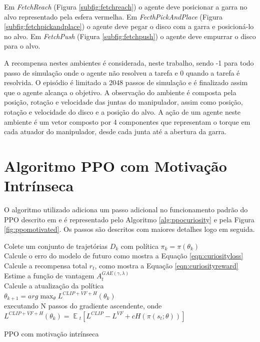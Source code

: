Em \textit{FetchReach} (Figura \ref{subfig:fetchreach}) o agente deve posicionar a garra no alvo representado pela esfera vermelha. Em \textit{FecthPickAndPlace} (Figura \ref{subfig:fetchpickandplace}) o agente deve pegar o disco com a garra e posicioná-lo no alvo. Em \textit{FetchPush} (Figura \ref{subfig:fetchpush}) o agente deve empurrar o disco para o alvo.

A recompensa nestes ambientes é considerada, neste trabalho, sendo -1 para todo passo de simulação onde o agente não resolveu a tarefa e 0 quando a tarefa é resolvida. O episódio é limitado a 2048 passos de simulação e é finalizado assim que o agente alcança o objetivo. A observação do ambiente é composta pela posição, rotação e velocidade das juntas do manipulador, assim como posição, rotação e velocidade do disco e a posição do alvo. A ação de um agente neste ambiente é um vetor composto por 4 componentes que representam o torque em cada atuador do manipulador, desde cada junta até a abertura da garra.


\section{Algoritmo PPO com Motivação Intrínseca}
\label{sec:algoritmo}

O algoritmo utilizado adiciona um passo adicional no funcionamento padrão do PPO descrito em \cite{achiam} e é representado pelo Algoritmo \ref{alg:ppocuriosity} e pela Figura \ref{fig:ppomotivated}. Os passos são descritos com maiores detalhes logo em seguida.

\medskip
\begin{center}
\begin{minipage}{0.92\textwidth}
\begin{algorithm2e}[H]
 \DontPrintSemicolon
  {
    Colete um conjunto de trajetórias $D_k$ com política $\pi_k = \pi(\theta_{k})$ \\
     {
        Calcule o erro do modelo de futuro como mostra a Equação \ref{eqn:curiosityloss} \\
        Calcule a recompensa total $r_t$, como mostra a Equação \ref{eqn:curiosityreward}
    }
    Estime a função de vantagem $A_{t}^{GAE(\gamma, \lambda)}$ \\
    Calcule a atualização da política \\
    \hspace{2cm}$\theta_{k+1} = arg \max_{\theta} L^{CLIP + VF + H}(\theta_k)$ \\
    executando N passos do gradiente ascendente, onde \\
    \hspace{2cm}$L^{CLIP + VF + H}(\theta_k) = \mathop{{}\mathbb{E}}{}_t [L^{CLIP} - L^{VF} + cH(\pi(s_t; \theta))]$ 
 }
\caption{PPO com motivação intrínseca \label{alg:ppocuriosity} }
\end{algorithm2e}
\end{minipage}
\end{center}

